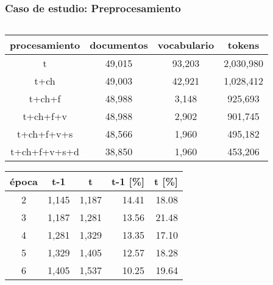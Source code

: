 \documentclass[
	spanish, %
	aspectratio=43, %
	hyperref={pdfencoding=auto,psdextra},
	xcolor={dvipsnames,table,usenames},
]{beamer}
\begin{document}
\begin{frame}[t]
\frametitle{Caso de estudio: Preprocesamiento}

\begin{columns}[t]
\begin{column}{0.5\textwidth}
\begin{table}[H]
    \begin{tabular}{|c|c|c|c|}
    \hline
    procesamiento & documentos & vocabulario & tokens  \\ \hline
    t             & 49,015      & 93,203       & 2,030,980 \\ \hline
    t+ch          & 49,003      & 42,921       & 1,028,412 \\ \hline
    t+ch+f        & 48,988      & 3,148        & 925,693  \\ \hline
    t+ch+f+v      & 48,988      & 2,902        & 901,745  \\ \hline
    t+ch+f+v+s    & 48,566      & 1,960        & 495,182  \\ \hline
    t+ch+f+v+s+d  & 38,850      & 1,960        & 453,206  \\ \hline
    \end{tabular}
\end{table}

\begin{table}[H]
    \begin{tabular}{|c|r|r|r|r|}
    \hline
    \textbf{época} & \multicolumn{1}{c|}{\textbf{t-1}} & \multicolumn{1}{c|}{\textbf{t}} & \multicolumn{1}{c|}{\textbf{t-1 {[}\%{]}}} & \multicolumn{1}{l|}{\textbf{t {[}\%{]}}} \\ \hline
    2              & 1,145                              & 1,187                            & 14.41                                      & 18.08                                    \\ \hline
    3              & 1,187                              & 1,281                            & 13.56                                      & 21.48                                    \\ \hline
    4              & 1,281                              & 1,329                            & 13.35                                      & 17.10                                    \\ \hline
    5              & 1,329                              & 1,405                            & 12.57                                      & 18.28                                    \\ \hline
    6              & 1,405                              & 1,537                            & 10.25                                      & 19.64                                    \\ \hline
    \end{tabular}
\end{table}
\end{column}


\end{columns}
\end{frame}
\end{document}
